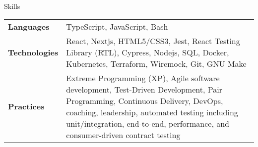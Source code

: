 \begin{section}{Skills}
  \begin{tabularx}{\linewidth}{@{}l X@{}}
    \textbf{Languages} &\small{TypeScript, JavaScript, Bash} \\
    \textbf{Technologies} &\small{React, Nextjs, HTML5/CSS3, Jest, React Testing Library (RTL), Cypress, Nodejs, SQL, Docker, Kubernetes, Terraform, Wiremock, Git, GNU Make} \\
    \textbf{Practices} &\small{Extreme Programming (XP), Agile software development, Test-Driven Development, Pair Programming, Continuous Delivery, DevOps, coaching, leadership, automated testing including unit/integration, end-to-end, performance, and consumer-driven contract testing} \\
  \end{tabularx}
\end{section}

